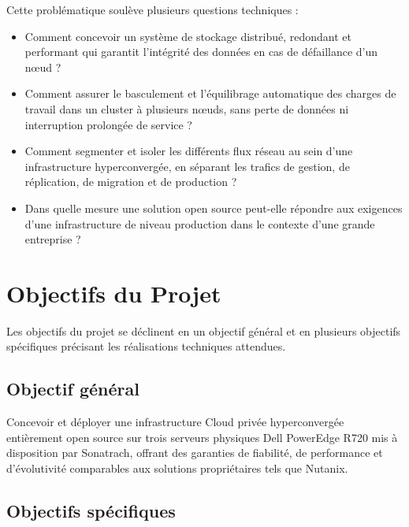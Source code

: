 \par Cette problématique soulève plusieurs questions techniques :\\

\begin{itemize}

    \item Comment concevoir un système de stockage distribué, redondant et performant qui garantit l'intégrité des données en cas de défaillance d'un n\oe{}ud ?

    \item Comment assurer le basculement et l'équilibrage automatique des charges de travail dans un cluster à plusieurs n\oe{}uds, sans perte de données ni interruption prolongée de service ?

    \item Comment segmenter et isoler les différents flux réseau au sein d'une infrastructure hyperconvergée, en séparant les trafics de gestion, de réplication, de migration et de production ?

    \item Dans quelle mesure une solution open source peut-elle répondre aux exigences d'une infrastructure de niveau production dans le contexte d'une grande entreprise ?

\end{itemize}

\section{Objectifs du Projet}

\par Les objectifs du projet se déclinent en un objectif général et en plusieurs objectifs spécifiques précisant les réalisations techniques attendues.\\

\subsection{Objectif général}

\par Concevoir et déployer une infrastructure Cloud privée hyperconvergée entièrement open source sur trois serveurs physiques Dell PowerEdge R720 mis à disposition par Sonatrach, offrant des garanties de fiabilité, de performance et d'évolutivité comparables aux solutions propriétaires tels que Nutanix.\\

\subsection{Objectifs spécifiques}

